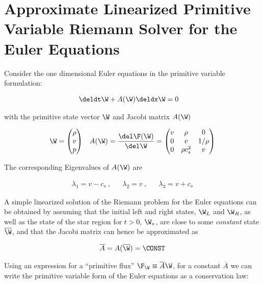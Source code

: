 \chapter{Approximate Linearized Primitive Variable Riemann Solver for the Euler Equations}
\label{app:riemann-primitive-variables}


Consider the one dimensional Euler equations in the primitive variable formulation:

\begin{align}
    \deldt \W + A(\W) \deldx \W = 0 &&
\end{align}

with the primitive state vector $\W$ and Jacobi matrix $A(\W)$

\begin{align}
    \W = \begin{pmatrix}
          \rho \\ v \\ p
         \end{pmatrix}
&&
    A(\W) = \frac{\del \F(\W)}{\del \W} = 
            \begin{pmatrix}
              v & \rho & 0 \\
              0 & v & 1/\rho \\
              0 & \rho c_s^2 & v
             \end{pmatrix}
\end{align}

The corresponding Eigenvalues of $A(\W)$ are

\begin{align}
 \lambda_1 = v - c_s \ , && \lambda_2 = v \ , && \lambda_3 = v + c_s
\end{align}

A simple linearized solution of the Riemann problem for the Euler equations can be obtained by 
assuming that the initial left and right states, $\W_L$ and $\W_R$, as well as the state of the 
star region for $t > 0$, $\W_*$, are close to some \emph{constant} state $\overline{\W}$, and that 
the Jacobi matrix can hence be approximated as

\begin{align}
\overline{A} = A(\overline{\W}) = \CONST
\end{align}

Using an expression for a ``primitive flux'' $\F_{\W} \equiv \overline{A} \W$, for a constant 
$\overline{A}$ we can write the primitive variable form of the Euler equations as a conservation 
law:

